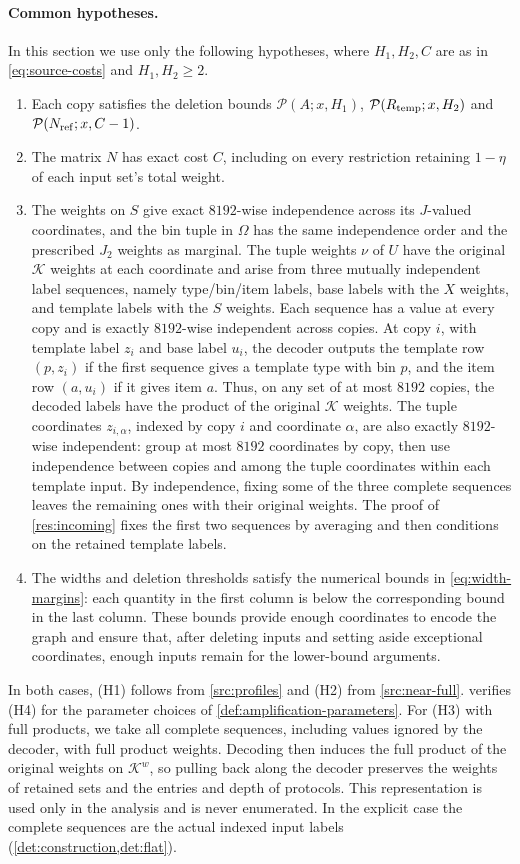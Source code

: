 \documentclass[11pt,letterpaper]{article} \usepackage[utf8]{inputenc}
\theoremstyle{plain} \newtheorem{theorem}{Theorem}[section]
\theoremstyle{definition} \newaliascnt{definition}{theorem}
\newcommand{\RP}[3]{\mathcal{P}(#1;#2,#3)}
\begin{document}
\paragraph{Common hypotheses.}
In this section we use only the following hypotheses, where $H_1,H_2,C$ are as in
\eqref{eq:source-costs} and $H_1,H_2\ge2$.
\begin{enumerate}
\item[(H1)] Each copy satisfies the deletion bounds $\RP{A}{x}{H_1}$,
$\RP{R_{\rm temp}}{x}{H_2}$ and $\RP{N_{\rm ref}}{x}{C-1}$.
\item[(H2)] The matrix $N$ has exact cost $C$, including on every restriction
retaining $1-\eta$ of each input set's total weight.
\item[(H3)] The weights on $S$ give exact $8192$-wise independence across its
$J$-valued coordinates, and the bin tuple in $\Omega$ has the same
independence order and the prescribed $J_2$ weights as marginal.
The tuple weights $\nu$ of $U$ have
the original $\mathcal K$ weights at each coordinate and arise from three mutually independent
label sequences, namely type/bin/item labels, base labels with the $X$ weights, and
template labels with the $S$ weights. Each sequence has a value at
every copy and is exactly $8192$-wise independent across copies. At copy $i$,
with template label $z_i$ and base label $u_i$, the decoder outputs
the template row $(p,z_i)$ if the first sequence gives a template type with bin $p$,
and the item row $(a,u_i)$ if it gives item $a$.
Thus, on any set of at most $8192$ copies, the decoded labels have the product of the original $\mathcal K$ weights.
The tuple coordinates \(z_{i,\alpha}\), indexed by copy $i$ and coordinate
$\alpha$, are also exactly $8192$-wise independent: group at most
$8192$ coordinates by copy, then use independence between copies and among
the tuple coordinates within each template input. By independence, fixing some of the three complete
sequences leaves the remaining ones with their original weights. The proof of
\cref{res:incoming} fixes the first two sequences by averaging and then
conditions on the retained template labels.
\item[(H4)] The widths and deletion thresholds satisfy the numerical bounds in
\eqref{eq:width-margins}: each quantity in the first column is below the
corresponding bound in the last column. These bounds provide enough coordinates
to encode the graph and ensure that, after deleting inputs and setting aside
exceptional coordinates, enough inputs remain for the lower-bound arguments.
\end{enumerate}
In both cases, (H1) follows from \cref{src:profiles} and (H2) from
\cref{src:near-full}.  verifies (H4) for the parameter
choices of \cref{def:amplification-parameters}. For (H3) with full products, we take all
complete sequences, including values ignored by the decoder, with full product
weights. Decoding then induces the full product of the original
weights on $\mathcal K^w$, so pulling back along the decoder preserves the weights of retained
sets and the entries and depth of protocols. This representation is used
only in the analysis and is never enumerated. In the explicit case the complete sequences are the
actual indexed input labels (\cref{det:construction,det:flat}).
\end{document}
